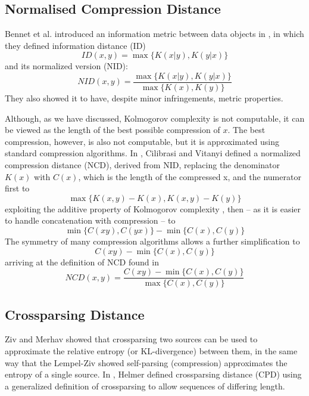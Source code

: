 \subsection{Normalised Compression Distance}
Bennet et al. introduced an information metric between data objects in \cite{}, in which they defined information distance (ID) 
\begin{equation}
	ID(x, y) = \max \{K(x|y), K(y|x)\}
\end{equation}
and its normalized version (NID):
\begin{equation}
    NID(x, y) = \frac{\max \{K(x | y), K(y | x)\}}{\max \{K(x), K(y)\}}
\end{equation}
They also showed it to have, despite minor infringements, metric properties.  

Although, as we have discussed, Kolmogorov complexity is not computable, it can be viewed as the length of the best possible compression of $x$. The best compression, however, is also not computable, but it is approximated using standard compression algorithms. In \cite{}, Cilibrasi and Vitanyi defined a normalized compression distance (NCD), derived from NID, replacing the denominator $K(x)$ with $C(x)$, which is the length of the compressed x, and the numerator first to 
\begin{equation}
\max\{K(x, y) - K(x), K(x, y) - K(y)\}
\end{equation}
exploiting the additive property of Kolmogorov complexity \cite{}, then -- as it is easier to handle concatenation with compression -- to \begin{equation}
\min\{C(xy), C(yx)\} - \min\{C(x), C(y)\}
\end{equation} The symmetry of many compression algorithms allows a further simplification to 
\begin{equation}
C(xy) - \min\{C(x), C(y)\}
\end{equation}
arriving at the definition of NCD found in \cite{}
\begin{equation}
    NCD(x, y) = \frac{C(xy) - \min \{C(x), C(y)\}}{\max \{C(x), C(y)\}}
\end{equation}

\subsection{Crossparsing Distance}
Ziv and Merhav\cite{} showed that crossparsing two sources can be used to approximate the relative entropy (or KL-divergence) between them, in the same way that the Lempel-Ziv\cite{} showed self-parsing (compression) approximates the entropy of a single source.  In \cite{}, Helmer defined crossparsing distance (CPD) using a generalized definition of crossparsing to allow sequences of differing length. 

